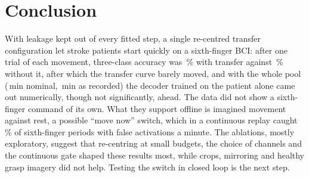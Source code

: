 \section{Conclusion}
\label{sec:conclusion}
With leakage kept out of every fitted step, a single re-centred transfer configuration let stroke
patients start quickly on a sixth-finger BCI: after one trial of each movement, three-class
accuracy was \rqTwoRestAhSfRctTslrKOneMean\,\% with transfer against
\rqTwoRestAhSfTsLrKOneMean\,\% without it, after which the transfer curve barely moved, and with
the whole pool (\rqTwoMinutesKAll\,min nominal, \rqTwoMinutesRecordedKAll\,min as recorded) the
decoder trained on the patient alone came out numerically, though not significantly, ahead. The
data did not show a sixth-finger command of its own. What they support offline is imagined
movement against rest, a possible ``move now'' switch, which in a continuous replay caught
\exFiveFingerFingerOnMean\,\% of sixth-finger periods with \exFiveFingerFalsePerMinMean{} false
activations a minute. The ablations, mostly exploratory, suggest that re-centring at small
budgets, the choice of channels and the continuous gate shaped these results most, while crops,
mirroring and healthy grasp imagery did not help. Testing the switch in closed loop is the next step.
